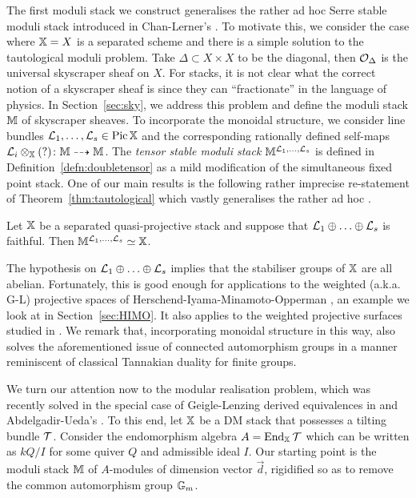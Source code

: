 \documentclass[12pt]{amsart}
\begin{document}
The first moduli stack we construct  generalises the rather ad hoc Serre stable moduli stack introduced in  Chan-Lerner's \cite{CL}. To motivate this, we consider the case where $\mathbb{X}=X$ is a separated scheme and  there is a simple solution to the tautological moduli problem. Take $\Delta \subset X \times X$ to be the diagonal, then $\mathcal{O}_{\Delta}$ is the universal skyscraper sheaf on $X$. For stacks, it is not clear what the correct notion of a skyscraper sheaf is since they can ``fractionate'' in the language of physics. In Section~\ref{sec:sky}, we address this problem and define the moduli stack $\mathbb{M}$ of skyscraper sheaves.
To incorporate the monoidal structure, we consider line bundles $\mathcal{L}_1,\ldots, \mathcal{L}_s \in \operatorname{Pic} \mathbb{X}$ and the corresponding rationally defined self-maps $\mathcal{L}_i \otimes_{\mathbb{X}} (?) \colon \mathbb{M} \dashrightarrow \mathbb{M}$. 
The {\em tensor stable moduli stack} $\mathbb{M}^{\mathcal{L}_1,\ldots,\mathcal{L}_s}$ is defined in Definition~\ref{defn:doubletensor} as a mild modification of the simultaneous fixed point stack. 
One of our main results is the following rather imprecise re-statement of Theorem~\ref{thm:tautological} which vastly generalises the rather ad hoc \cite[Theorem~9.6]{CL}.
\begin{theorem}
Let $\mathbb{X}$ be a separated quasi-projective stack and suppose that $\mathcal{L}_1\oplus \ldots \oplus \mathcal{L}_s$ is faithful. Then $\mathbb{M}^{\mathcal{L}_1,\ldots,\mathcal{L}_s} \simeq \mathbb{X}$.
\end{theorem}
\noindent The hypothesis on $\mathcal{L}_1\oplus \ldots \oplus\mathcal{L}_s$ implies that the stabiliser groups of $\mathbb{X}$ are all abelian. Fortunately, this is good enough for applications to the weighted (a.k.a. G-L) projective spaces of Herschend-Iyama-Minamoto-Opperman \cite{HIMO}, an example we look at in Section~\ref{sec:HIMO}. It also applies to the weighted projective surfaces studied in \cite{C17}. We remark that, incorporating monoidal structure in this way, also solves the aforementioned issue of connected automorphism groups in a manner reminiscent of classical Tannakian duality for finite groups.

We turn our attention now to the modular realisation problem, which was recently solved in the special case of Geigle-Lenzing \cite{GL} derived equivalences in \cite{CL} and Abdelgadir-Ueda's \cite{AU}. To this end, let $\mathbb{X}$ be a DM stack that possesses a tilting bundle $\mathcal{T}$. Consider the endomorphism algebra $A = \operatorname{End}_{\mathbb{X}} \mathcal{T}$ which can be written as $kQ/I$ for some quiver $Q$ and admissible ideal $I$. Our starting point is the moduli stack $\mathbb{M}$ of $A$-modules of dimension vector $\vec{d}$, rigidified so as to remove the common automorphism group $\mathbb{G}_m$. 
\end{document}
